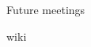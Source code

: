 \documentclass[10pt, compress, draft]{beamer}
\begin{document}
\begin{frame}{Future}
	meetings
	
	wiki 
	
	
\end{frame}
\end{document}
